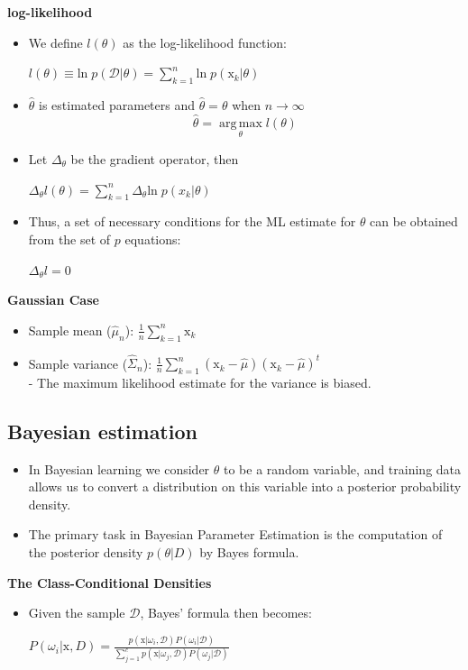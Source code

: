 \documentclass{../cheat}
\begin{document}
\begin{multicols}{3}
		\textbf{log-likelihood}
		\begin{itemize}[nolistsep, leftmargin=1em]
			\item We define $l(\theta)$ as the log-likelihood function:\\
				\centerline{$l(\theta) \equiv \text{ln} \; p(\mathcal{D}|\theta) =\sum_{k=1}^{n} \text{ln} \; p(\mathrm{x}_k|\theta)$}
		 	\item $\hat{\theta}$ is estimated parameters and $\hat{\theta}=\theta$ when $n \rightarrow \infty$
		 		\[\hat{\theta}=\operatorname*{arg\,max}_\theta l(\theta)\]
		 	\item Let $\Delta_\theta$ be the gradient operator, then\\
		 		\centerline{$\Delta_\theta l(\theta)=\sum_{k=1}^{n} \Delta_\theta \text{ln} \; p(x_k|\theta)$}
		 	\item Thus, a set of necessary conditions for the ML estimate for $\theta$ can be
obtained from the set of $p$ equations:\\
				\centerline{$\Delta_\theta l=0$}
		\end{itemize}
	
		\textbf{Gaussian Case}
		\begin{itemize}[nolistsep, leftmargin=1em]
		 	\item Sample mean ($\hat{\mu}_n$): $\frac{1}{n} \sum_{k=1}^n \mathrm{x}_k$
		 	\item Sample variance ($\widehat{\Sigma}_n$): 
		 		$\frac{1}{n} \sum_{k=1}^n (\mathrm{x}_k-\hat{\mu}) (\mathrm{x}_k-\hat{\mu}) ^t$\\
		 	 - The maximum likelihood estimate for the variance is biased.
		\end{itemize}
		
		
		\subsection{Bayesian estimation}
			\begin{itemize}[nolistsep, leftmargin=1em]
				\item In Bayesian learning we consider $\theta$ to be a random variable, and training data allows us to convert a distribution on this variable into a posterior probability density.
				\item The primary task in Bayesian Parameter Estimation is the computation of the posterior density $p(\theta|D)$ by Bayes formula.
			\end{itemize}
	
			\textbf{The Class-Conditional Densities}
			\begin{itemize}[nolistsep, leftmargin=1em]
				\item Given the sample $\mathcal{D}$, Bayes’ formula then becomes:\\
					\centerline{$P(\omega_i|\mathrm{x},D) = \frac{p(\mathrm{x}|\omega_i,\mathcal{D})P(\omega_i|\mathcal{D})}{\sum^c_{j=1} p(\mathrm{x}|\omega_j ,\mathcal{D}) P(\omega_j|\mathcal{D})}$}
				

\end{itemize}
\end{multicols}
\end{document}

